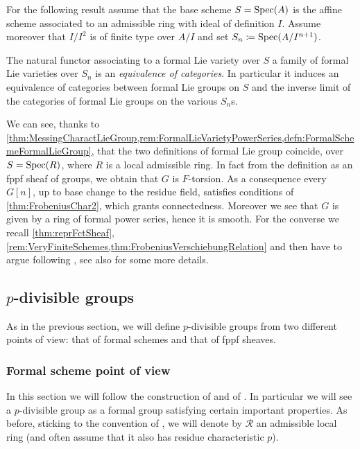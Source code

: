 \noindent
For the following result assume that the base scheme \(S = \operatorname{Spec}(A)\)
is the affine scheme associated to an admissible ring with ideal of definition \(I\).
Assume moreover that \(I/I^2\) is of finite type over \(A/I\) and
set \(S_n \coloneqq \operatorname{Spec}(A/I^{ n+1 })\).
\begin{lem}
	The natural functor associating to a formal Lie variety over \(S\)
	a family of formal Lie varieties over \(S_n\) is an
	\emph{equivalence of categories}.
	In particular it induces an equivalence of categories
	between formal Lie groups on \(S\) and the inverse limit of the categories
	of formal Lie groups on the various \(S_n\)s.
\end{lem}


\begin{rem}
	We can see, thanks to 
	\cref{thm:MessingCharactLieGroup,rem:FormalLieVarietyPowerSeries,defn:FormalSchemeFormalLieGroup},
	that the two definitions of formal Lie group coincide, over
	$S = \operatorname{Spec}(R)$, where $R$ is a local admissible ring.
	In fact from the definition as an fppf sheaf of groups,
	we obtain that $G$ is $F$-torsion.
	As a consequence every $G[n]$, up to base
	change to the residue field, satisfies conditions of \cref{thm:FrobeniusChar2},
	which grants connectedness.
	Moreover we see that $G$ is given by a ring of formal power series,
	hence it is smooth.
	For the converse we recall
	\cref{thm:reprFctSheaf},
	\cref{rem:VeryFiniteSchemes,thm:FrobeniusVerschiebungRelation}
	and then have to argue following \cite[proposition 1]{TatePC}, see
	also \cite[Chapter II, \S2, theorem 2.1.7]{Messing} for some more details.
\end{rem}



\subsection{\texorpdfstring{$p$}{p}-divisible groups}
As in the previous section, we will define $p$-divisible groups
from two different points of view: that of formal schemes
and that of fppf sheaves.



\subsubsection{Formal scheme point of view}
In this section we will follow the construction of \cite[\S2]{TatePC} and
of \cite[\S6]{Shatz}. 
In particular we will see a $p$-divisible group as a formal group
satisfying certain important properties.
As before, sticking to the convention of \cite{Shatz}, we will 
denote by $\mathscr{R}$ an admissible local ring (and often assume that
it also has residue characteristic $p$).


